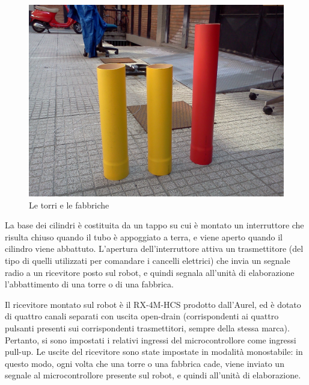 \begin{figure}
\centering
\includegraphics[scale=0.15]{images/torri}
\caption{Le torri e le fabbriche}
\end{figure}

La base dei cilindri è costituita da un tappo su cui è montato un interruttore che risulta chiuso quando il tubo è appoggiato a terra, e viene aperto quando il cilindro viene abbattuto. L'apertura dell'interruttore attiva un trasmettitore (del tipo di quelli utilizzati per comandare i cancelli elettrici) che invia un segnale radio a un ricevitore posto sul robot, e quindi segnala all'unità di elaborazione l'abbattimento di una torre o di una fabbrica.

Il ricevitore montato sul robot è il RX-4M-HCS prodotto dall'Aurel, ed è dotato di quattro canali separati con uscita open-drain (corrispondenti ai quattro pulsanti presenti sui corrispondenti trasmettitori, sempre della stessa marca). Pertanto, si sono impostati i relativi ingressi del microcontrollore come ingressi pull-up. Le uscite del ricevitore sono state impostate in modalità monostabile: in questo modo, ogni volta che una torre o una fabbrica cade, viene inviato un segnale al microcontrollore presente sul robot, e quindi all'unità di elaborazione.
